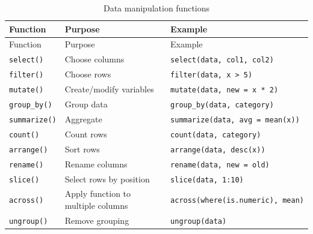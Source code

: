 \documentclass[
  letterpaper,
  DIV=11,
  numbers=noendperiod]{scrreprt}
\begin{document}
\begin{longtable}[]{@{}
  >{\raggedright\arraybackslash}p{}
  >{\raggedright\arraybackslash}p{}
  >{\raggedright\arraybackslash}p{}@{}}
\caption{Data manipulation
functions}\label{tbl-dplyr-ref}\tabularnewline
\toprule\noalign{}
\begin{minipage}[b]{\linewidth}\raggedright
Function
\end{minipage} & \begin{minipage}[b]{\linewidth}\raggedright
Purpose
\end{minipage} & \begin{minipage}[b]{\linewidth}\raggedright
Example
\end{minipage} \\
\midrule\noalign{}
\endfirsthead
\toprule\noalign{}
\begin{minipage}[b]{\linewidth}\raggedright
Function
\end{minipage} & \begin{minipage}[b]{\linewidth}\raggedright
Purpose
\end{minipage} & \begin{minipage}[b]{\linewidth}\raggedright
Example
\end{minipage} \\
\midrule\noalign{}
\endhead
\bottomrule\noalign{}
\endlastfoot
\texttt{select()} & Choose columns &
\texttt{select(data,\ col1,\ col2)} \\
\texttt{filter()} & Choose rows &
\texttt{filter(data,\ x\ \textgreater{}\ 5)} \\
\texttt{mutate()} & Create/modify variables &
\texttt{mutate(data,\ new\ =\ x\ *\ 2)} \\
\texttt{group\_by()} & Group data &
\texttt{group\_by(data,\ category)} \\
\texttt{summarize()} & Aggregate &
\texttt{summarize(data,\ avg\ =\ mean(x))} \\
\texttt{count()} & Count rows & \texttt{count(data,\ category)} \\
\texttt{arrange()} & Sort rows & \texttt{arrange(data,\ desc(x))} \\
\texttt{rename()} & Rename columns &
\texttt{rename(data,\ new\ =\ old)} \\
\texttt{slice()} & Select rows by position &
\texttt{slice(data,\ 1:10)} \\
\texttt{across()} & Apply function to multiple columns &
\texttt{across(where(is.numeric),\ mean)} \\
\texttt{ungroup()} & Remove grouping & \texttt{ungroup(data)} \\
\end{longtable}
\end{document}
